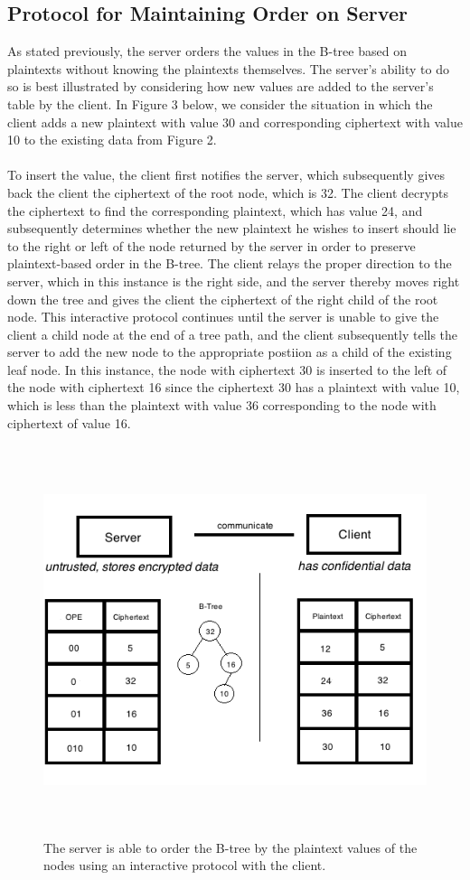 \documentclass[12pt]{article}
\begin{document}
\subsection{Protocol for Maintaining Order on Server}
As stated previously, the server orders the values in the B-tree based on plaintexts without knowing the plaintexts themselves. The server's ability to do so is best illustrated by considering how new values are added to the server's table by the client. In Figure 3 below, we consider the situation in which the client adds a new plaintext with value 30 and corresponding ciphertext with value 10 to the existing data from Figure 2. \\ \\
To insert the value, the client first notifies the server, which subsequently gives back the client the ciphertext of the root node, which is 32. The client decrypts the ciphertext to find the corresponding plaintext, which has value 24, and subsequently determines whether the new plaintext he wishes to insert should lie to the right or left of the node returned by the server in order to preserve plaintext-based order in the B-tree. The client relays the proper direction to the server, which in this instance is the right side, and the server thereby moves right down the tree and gives the client the ciphertext of the right child of the root node. This interactive protocol continues until the server is unable to give the client a child node at the end of a tree path, and the client subsequently tells the server to add the new node to the appropriate postiion as a child of the existing leaf node. In this instance, the node with ciphertext 30 is inserted to the left of the node with ciphertext 16 since the ciphertext 30 has a plaintext with value 10, which is less than the plaintext with value 36 corresponding to the node with ciphertext of value 16. 
\begin{figure}[htb]
\begin{center}
\includegraphics[height=4.5in,width=6in,angle=0]{857pic5.png}
\caption{The server is able to order the B-tree by the plaintext values of the nodes using an interactive protocol with the client.}
\end{center}
\end{figure}
\end{document}
